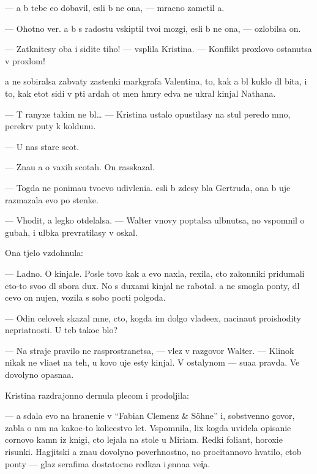 \documentclass[10pt]{book}
\begin{document}
— {\Y}a b{\yi} tebe {\y}e{\x}o dobavil, {\y}esli b{\yi} ne ona, — mracno zametil {\y}a.

— Ohotno ver{\io}. {\Y}a b{\yi} s radost{\y}u vskip{\ia}til tvo{\y}i mozgi, {\y}esli b{\yi} ne ona, — ozlobilsa on.

— Zatknitesy oba i sidite tiho! — vsp{\yi}lila Kristina. — Konflikt{\yi} proxlovo ostanutsa v proxlom!

{\Y}a ne sobiralsa zab{\yi}vaty zastenki markgrafa Valentina, to, kak {\y}a b{\yi}l kuklo{\y} dl{\ia} bit{\y}a, i to, kak etot sid{\ia}{\x}i{\y} v p{\ia}ti {\y}ardah ot men{\ia} hm{\yi}ry {\y}edva ne ukral kinjal Nathana.

— T{\yi} ranyxe takim ne b{\yi}l… — Kristina ustalo opustilasy na stul peredo mno{\y}, perekr{\yi}v puty k koldunu.

— U nas star{\yi}{\y}e scot{\yi}.

— Zna{\y}u {\y}a o vaxih scotah. On rasskazal.

— Togda ne ponima{\y}u tvo{\y}evo udivleni{\y}a. {\Y}esli b{\yi} zdesy b{\yi}la Gertruda, ona b{\yi} uje razmazala {\y}evo po stenke.

— V{\yi}hodit, {\y}a legko otdelalsa. — Walter vnovy pop{\yi}talsa ul{\yi}bnutsa, no vspomnil o gubah, i ul{\yi}bka prevratilasy v oskal.

Ona t{\ia}jelo vzdohnula:

— Ladno. O kinjale. Posle tovo kak {\y}a {\y}evo naxla, rexila, cto zakonniki pridumali cto-to svo{\y}o dl{\ia} sbo\-ra dux. No s duxami kinjal ne ra\-bo\-tal. {\Y}a ne smogla pon{\ia}ty, dl{\ia} cevo on nujen, vozila s sobo{\y} pocti polgoda.

— Odin celovek skazal mne, cto, kogda im dolgo vlade{\y}ex, nacina{\y}ut proishodity nepri\-{\y}at\-nosti. U teb{\ia} tako{\y}e b{\yi}lo?

— Na straje{\y} pravilo ne rasprostran{\ia}{\y}etsa, — vlez v razgovor Walter. — Klinok nikak ne vli{\y}a{\y}et na teh, u kovo uje {\y}esty kinjal{\yi}. V ostalynom — su{\x}a{\y}a pravda. Ve{\x} dovolyno opasna{\y}a.

Kristina razdrajonno dernula plecom i prodoljila:

— {\Y}a sdala {\y}evo na hraneni{\y}e v ``Fabian Clemenz \& Söhne'' i, sobstvenno go\-vo\-r{\ia}, zab{\yi}la o n{\e}m na kako{\y}e-to kolicestvo let. Vspomnila, lix kogda uvidela opisani{\y}e cornovo kamn{\ia} iz knigi, cto lejala na stole u Mi\-ri\-am. Redki{\y} foliant, horoxi{\y}e risunki. Hagjitski{\y} {\y}a zna{\y}u dovolyno poverhnostno, no procitannovo hvatilo, ctob{\yi} pon{\ia}ty — glaz serafima dostatocno redka{\y}a i {\c}enna{\y}a ve{\x}i{\c}a.
\end{document}
